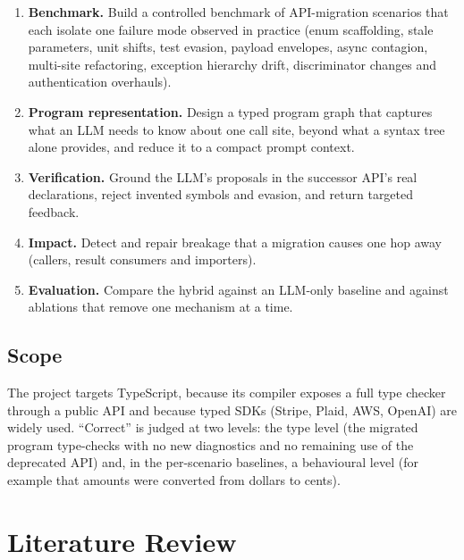\documentclass[11pt,a4paper]{article}
\begin{document}
\begin{enumerate}
  \item[\textbf{O1}] \textbf{Benchmark.} Build a controlled benchmark of API-migration
        scenarios that each isolate one failure mode observed in practice (enum scaffolding,
        stale parameters, unit shifts, test evasion, payload envelopes, async contagion,
        multi-site refactoring, exception hierarchy drift, discriminator changes and
        authentication overhauls).
  \item[\textbf{O2}] \textbf{Program representation.} Design a typed program graph that
        captures what an LLM needs to know about one call site, beyond what a syntax tree
        alone provides, and reduce it to a compact prompt context.
  \item[\textbf{O3}] \textbf{Verification.} Ground the LLM's proposals in the successor
        API's real declarations, reject invented symbols and evasion, and return targeted
        feedback.
  \item[\textbf{O4}] \textbf{Impact.} Detect and repair breakage that a migration causes
        one hop away (callers, result consumers and importers).
  \item[\textbf{O5}] \textbf{Evaluation.} Compare the hybrid against an LLM-only baseline
        and against ablations that remove one mechanism at a time.
\end{enumerate}

\subsection{Scope}

The project targets TypeScript, because its compiler exposes a full type checker through a
public API \citep{tscompilerapi,bierman2014typescript} and because typed SDKs (Stripe,
Plaid, AWS, OpenAI) are widely used. ``Correct'' is judged at two levels: the type level
(the migrated program type-checks with no new diagnostics and no remaining use of the
deprecated API) and, in the per-scenario baselines, a behavioural level (for example that
amounts were converted from dollars to cents).

\section{Literature Review}
\label{sec:lit}
\end{document}
